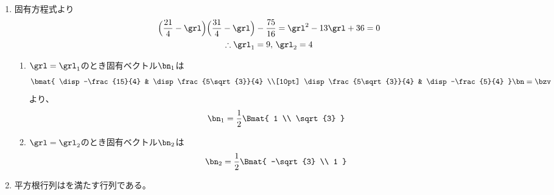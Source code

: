 \begin{ans*}
  ${}$
  \begin{enumerate}[label=(\arabic*)]
    \item 固有方程式より
    \begin{gather}
      \Bigl( \frac{21}{4} - \grl \Bigr)
      \Bigl( \frac{31}{4} - \grl \Bigr)
      -\frac{75}{16}
      = \grl^2 - 13\grl + 36 = 0 \\
      \therefore \grl_1 = 9,\,\grl_2 = 4
    \end{gather}
    \begin{enumerate}[label=(\roman*)]
      \item $\grl=\grl_1$のとき固有ベクトル$\bn_1$は
      \begin{gather}
        \bmat{
          \disp -\frac{15}{4} & \disp \frac{5\sqrt{3}}{4} \\[10pt]
          \disp \frac{5\sqrt{3}}{4} & \disp -\frac{5}{4}
        }\bn = \bzv
      \end{gather}
      より、
      \begin{gather}
        \bn_1 = \frac{1}{2}\Bmat{
          1 \\ \sqrt{3}
        }
      \end{gather}
      \item $\grl=\grl_2$のとき固有ベクトル$\bn_2$は
      \begin{gather}
        \bn_2 = \frac{1}{2}\Bmat{
          -\sqrt{3} \\ 1
        }
      \end{gather}
    \end{enumerate}
    \item 平方根行列はを満たす行列である。


\end{enumerate}
\end{ans*}
